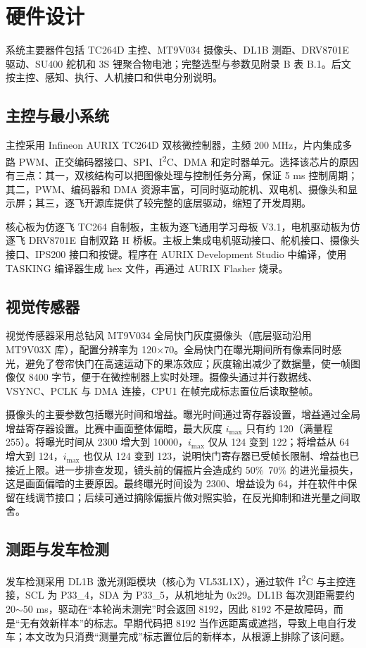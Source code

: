 \documentclass{MaiTechReport}
\begin{document}
\section{硬件设计}
\label{sec:hardware}

系统主要器件包括 TC264D 主控、MT9V034 摄像头、DL1B 测距、DRV8701E 驱动、SU400 舵机和 3S 锂聚合物电池；完整选型与参数见附录 B 表 B.1。后文按主控、感知、执行、人机接口和供电分别说明。



\subsection{主控与最小系统}
主控采用 Infineon AURIX TC264D 双核微控制器，主频 200 MHz，片内集成多路 PWM、正交编码器接口、SPI、I\textsuperscript{2}C、DMA 和定时器单元。选择该芯片的原因有三点：其一，双核结构可以把图像处理与控制任务分离，保证 5 ms 控制周期；其二，PWM、编码器和 DMA 资源丰富，可同时驱动舵机、双电机、摄像头和显示屏；其三，逐飞开源库提供了较完整的底层驱动，缩短了开发周期。

核心板为仿逐飞 TC264 自制板，主板为逐飞通用学习母板 V3.1，电机驱动板为仿逐飞 DRV8701E 自制双路 H 桥板。主板上集成电机驱动接口、舵机接口、摄像头接口、IPS200 接口和按键。程序在 AURIX Development Studio 中编译，使用 TASKING 编译器生成 hex 文件，再通过 AURIX Flasher 烧录。

\subsection{视觉传感器}
视觉传感器采用总钻风 MT9V034 全局快门灰度摄像头（底层驱动沿用 MT9V03X 库），配置分辨率为 120$\times$70。全局快门在曝光期间所有像素同时感光，避免了卷帘快门在高速运动下的果冻效应；灰度输出减少了数据量，使一帧图像仅 8400 字节，便于在微控制器上实时处理。摄像头通过并行数据线、VSYNC、PCLK 与 DMA 连接，CPU1 在帧完成标志置位后读取整帧。

摄像头的主要参数包括曝光时间和增益。曝光时间通过寄存器设置，增益通过全局增益寄存器设置。比赛中画面整体偏暗，最大灰度 $i_{\max}$ 只有约 120（满量程 255）。将曝光时间从 2300 增大到 10000，$i_{\max}$ 仅从 124 变到 122；将增益从 64 增大到 124，$i_{\max}$ 也仅从 124 变到 123，说明快门寄存器已受帧长限制、增益也已接近上限。进一步排查发现，镜头前的偏振片会造成约 50\%~70\% 的进光量损失，这是画面偏暗的主要原因。最终曝光时间设为 2300、增益设为 64，并在软件中保留在线调节接口；后续可通过摘除偏振片做对照实验，在反光抑制和进光量之间取舍。

\subsection{测距与发车检测}
发车检测采用 DL1B 激光测距模块（核心为 VL53L1X），通过软件 I\textsuperscript{2}C 与主控连接，SCL 为 P33\_4，SDA 为 P33\_5，从机地址为 0x29。DL1B 每次测距需要约 20$\sim$50 ms，驱动在“本轮尚未测完”时会返回 8192，因此 8192 不是故障码，而是“无有效新样本”的标志。早期代码把 8192 当作远距离或遮挡，导致上电自行发车；本文改为只消费“测量完成”标志置位后的新样本，从根源上排除了该问题。
\end{document}
